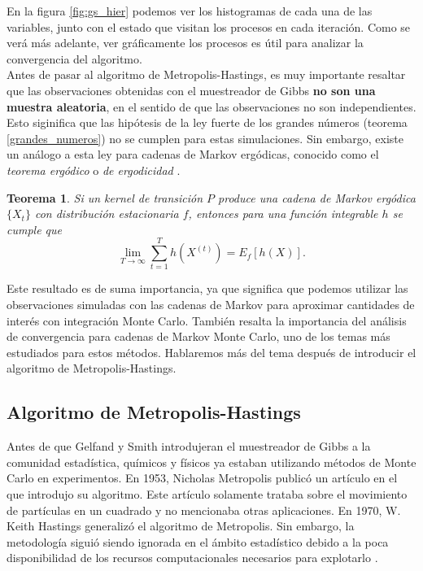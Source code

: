 \documentclass[11pt,a4paper]{article}
\newtheorem{theorem}{Teorema}[section]
\begin{document}
En la figura \ref{fig:gs_hier} podemos ver los histogramas de cada una de las variables, junto con el estado que visitan los procesos en cada iteración. Como se verá más adelante, ver gráficamente los procesos es útil para analizar la convergencia del algoritmo.\\

Antes de pasar al algoritmo de Metropolis-Hastings, es muy importante resaltar que las observaciones obtenidas con el muestreador de Gibbs \textbf{no son una muestra aleatoria}, en el sentido de que las observaciones no son independientes. Esto siginifica que las hipótesis de la ley fuerte de los grandes números (teorema \ref{grandes_numeros}) no se cumplen para estas simulaciones. Sin embargo, existe un análogo a esta ley para cadenas de Markov ergódicas, conocido como el \textit{teorema ergódico} o \textit{de ergodicidad} \citep{casella}.

\begin{theorem}
Si un kernel de transición $P$ produce una cadena de Markov ergódica $\lbrace X_t \rbrace$ con distribución estacionaria $f$, entonces para una función integrable $h$ se cumple que
\begin{equation}
\lim_{T \to \infty} \sum_{t = 1}^T h(X^{(t)}) = E_f[h(X)].
\end{equation}
\end{theorem}


Este resultado es de suma importancia, ya que significa que podemos utilizar las observaciones simuladas con las cadenas de Markov para aproximar cantidades de interés con integración Monte Carlo. También resalta la importancia del análisis de convergencia para cadenas de Markov Monte Carlo, uno de los temas más estudiados para estos métodos. Hablaremos más del tema después de introducir el algoritmo de Metropolis-Hastings.\\

\subsection{Algoritmo de Metropolis-Hastings}
\label{sec:mh}

Antes de que Gelfand y Smith introdujeran el muestreador de Gibbs a la comunidad estadística, químicos y físicos ya estaban utilizando métodos de Monte Carlo en experimentos. En 1953, Nicholas Metropolis publicó un artículo en el que introdujo su algoritmo. Este artículo solamente trataba sobre el movimiento de partículas en un cuadrado y no mencionaba otras aplicaciones. En 1970, W. Keith Hastings generalizó el algoritmo de Metropolis. Sin embargo, la metodología siguió siendo ignorada en el ámbito estadístico debido a la poca disponibilidad de los recursos computacionales necesarios para explotarlo \citep{bertsch}.\\
\end{document}
